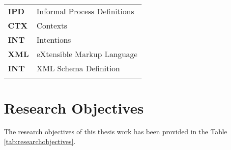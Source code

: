 \begin{center}
	\begin{longtable}{p{5cm}p{11cm}} 
		\textbf{IPD} & Informal Process Definitions\\
		\textbf{CTX} & Contexts\\
		\textbf{INT} & Intentions\\
		\textbf{XML} & eXtensible Markup Language\\
		\textbf{INT} & XML Schema Definition\\
		
       \label{tab:abbreviations}
    \end{longtable}	
\end{center}




\section {Research Objectives}
\label{sec:researchobjectives}
\label{sec:researchobj}
The research objectives of this thesis work has been provided in the Table \ref{tab:researchobjectives}.

